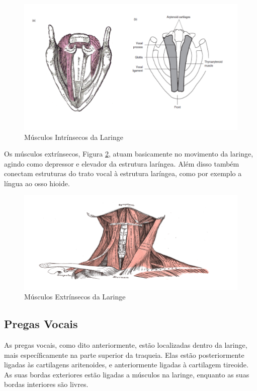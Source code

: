 \begin{figure}
	\centering
	\includegraphics[scale=0.5]{musculosLaringe}
	\caption{Músculos Intrínsecos da Laringe}
	\label{fig:musculos}
\end{figure}

Os músculos extrínsecos, Figura \ref{fig:musculoExterno}, atuam basicamente no movimento da laringe, agindo como depressor e elevador da estrutura laríngea. Além disso também conectam estruturas do trato vocal à estrutura laríngea, como por exemplo a língua ao osso hioide.


\begin{figure}
	\centering
	\includegraphics[scale=0.5]{musculosExternosLaringe}
	\caption{Músculos Extrínsecos da Laringe }
	\label{fig:musculoExterno}
\end{figure}

\subsection{Pregas Vocais}

As pregas vocais, como dito anteriormente, estão localizadas dentro da laringe, mais especíﬁcamente na parte superior da traqueia. Elas estão posteriormente ligadas às cartilagens aritenoides, e anteriormente ligadas à cartilagem tireoide. As suas bordas exteriores estão ligadas a músculos na laringe, enquanto as suas bordas interiores são livres.

